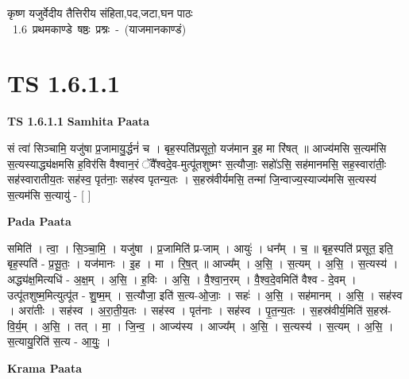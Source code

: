 \documentclass[17pt]{extarticle}
\begin{document}
\begin{titlepage}
    \begin{center}
 
\begin{sanskrit}
    { \Huge
    कृष्ण यजुर्वेदीय तैत्तिरीय संहिता,पद,जटा,घन पाठः 
    }
    \\
    \vspace{2.5cm}
    \mbox{ \Huge
    1.6     प्रथमकाण्डे षष्ठः प्रश्नः - (याजमानकाण्डं)   }
\end{sanskrit}
\end{center}

\end{titlepage}
\tableofcontents
\pagebreak

\section*{ TS 1.6.1.1 }

\textbf{TS 1.6.1.1 } \newline
\textbf{Samhita Paata} \newline

सं त्वा॑ सिञ्चामि॒ यजु॑षा प्र॒जामायु॒र्द्धनं॑ च । बृह॒स्पति॑प्रसूतो॒ यज॑मान इ॒ह मा रि॑षत् ॥ आज्य॑मसि स॒त्यम॑सि स॒त्यस्याद्ध्य॑क्षमसि ह॒विर॑सि वैश्वान॒रं ॅवै᳚श्वदे॒व-मुत्पू॑तशुष्मꣳ स॒त्यौजाः॒ सहो॑ऽसि॒ सह॑मानमसि॒ सह॒स्वारा॑तीः॒ सह॑स्वारातीय॒तः सह॑स्व॒ पृत॑नाः॒ सह॑स्व पृतन्य॒तः । स॒हस्र॑वीर्यमसि॒ तन्मा॑ जि॒न्वाज्य॒स्याज्य॑मसि स॒त्यस्य॑ स॒त्यम॑सि स॒त्यायु॑ - [ ] \newline

\textbf{Pada Paata} \newline

समिति॑ । त्वा॒ । सि॒ञ्चा॒मि॒ । यजु॑षा । प्र॒जामिति॑ प्र-जाम् । आयुः॑ । धन᳚म् । च॒ ॥ बृह॒स्पति॑ प्रसूत॒ इति॒ बृह॒स्पति॑ - प्र॒सू॒तः॒ । यज॑मानः । इ॒ह । मा । रि॒ष॒त् ॥ आज्य᳚म् । अ॒सि॒ । स॒त्यम् । अ॒सि॒ । स॒त्यस्य॑ । अद्ध्य॑क्ष॒मित्यधि॑ - अ॒क्ष॒म् । अ॒सि॒ । ह॒विः । अ॒सि॒ । वै॒श्वा॒न॒रम् । वै॒श्व॒दे॒वमिति॑ वैश्व - दे॒वम् । उत्पू॑तशुष्म॒मित्युत्पू॑त - शु॒ष्म॒म् । स॒त्यौजा॒ इति॑ स॒त्य-ओ॒जाः॒ । सहः॑ । अ॒सि॒ । सह॑मानम् । अ॒सि॒ । सह॑स्व । अरा॑तीः । सह॑स्व । अ॒रा॒ती॒य॒तः । सह॑स्व । पृत॑नाः । सह॑स्व । पृ॒त॒न्य॒तः । स॒हस्र॑वीर्य॒मिति॑ स॒हस्र॑-वि॒र्य॒म् । अ॒सि॒ । तत् । मा॒ । जि॒न्व॒ । आज्य॑स्य । आज्य᳚म् । अ॒सि॒ । स॒त्यस्य॑ । स॒त्यम् । अ॒सि॒ । स॒त्यायु॒रिति॑ स॒त्य - आ॒युः॒ ।  \newline


\textbf{Krama Paata} \newline
\end{document}
